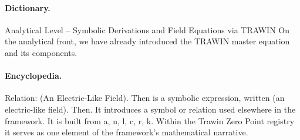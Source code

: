 \paragraph{Dictionary.}
Analytical Level – Symbolic Derivations and Field Equations via TRAWIN On the analytical front, we have already introduced the TRAWIN master equation and its components.

\paragraph{Encyclopedia.}
Relation: (An Electric-Like Field). Then is a symbolic expression, written (an electric-like field). Then. It introduces a symbol or relation used elsewhere in the framework. It is built from a, n, l, c, r, k. Within the Trawin Zero Point registry it serves as one element of the framework's mathematical narrative.
